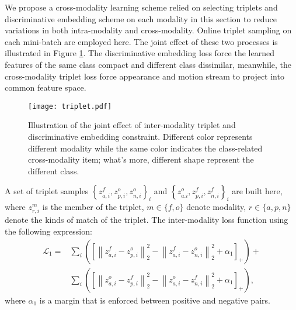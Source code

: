 \documentclass[conference,compsoc]{IEEEtran}
\begin{document}
We propose a cross-modality learning scheme relied on selecting triplets and discriminative embedding scheme on each modality in this section to reduce variations in both intra-modality and cross-modality. Online triplet sampling on each mini-batch \cite{hermans2017defense} are employed here. The joint effect of these two processes is illustrated in Figure \ref{fig:triplet}. The discriminative embedding loss force the learned features of the same class compact and different class dissimilar, meanwhile, the cross-modality triplet loss force appearance and motion stream to project into common feature space.

\begin{figure}[h]
    \centering
    \texttt{[image: triplet.pdf]}
    \caption{Illustration of the joint effect of inter-modality triplet and discriminative embedding constraint. Different color represents different modality while the same color indicates the class-related cross-modality item; what's more, different shape represent the different class.}
    \label{fig:triplet}
\end{figure}

A set of triplet samples $\left\{z_{a, i}^{f}, z_{p, i}^{o}, z_{n, i}^{o} \right\}_{i}$ and $\left\{z_{a. i}^{o}, z_{p, i}^{f}, z_{n, i}^{f}\right\}_{i}$ are built here, where $z_{r, i}^{m}$ is the member of the triplet, $m \in \{f, o\}$ denote modality, $r \in \{a, p, n \}$ denote the kinds of match of the triplet. The inter-modality loss function using the following expression:
\begin{equation}
\begin{split} 
    \mathcal{L}_ { 1 } = & \sum _ { i } \left( \left[ \left\| z _ { a , i } ^ { f } - z _ { p , i } ^ { o } \right\| _ { 2 } ^ { 2 } - \left\| z _ { a , i } ^ { f } -  z _ { n , i } ^ { o }\right\| _ { 2 } ^ { 2 } + \alpha _ { 1 } \right] _ { + } \right) + \\
    & \sum_{i} \left( \left[ \left\| z _ { a , i } ^ { o } - z _ { p , i } ^ { f } \right\| _ { 2 } ^ { 2 } - \left\| z _ { a , i } ^ { o } - z _ { n , i } ^ { f } \right\| _ { 2 } ^ { 2 } + \alpha _ { 1 } \right] _ { + } \right), 
\end{split}
\end{equation}
where $\alpha_{1}$ is a margin that is enforced between positive and negative pairs.
\end{document}
